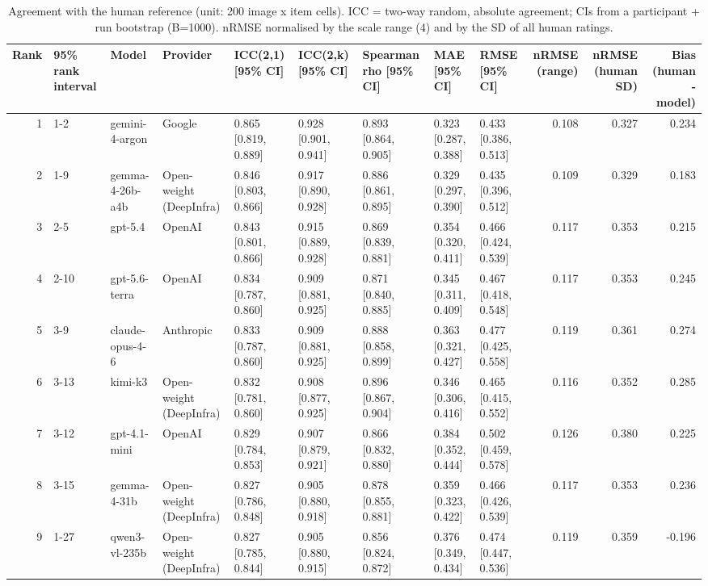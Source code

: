 \begin{table}
\caption{Agreement with the human reference (unit: 200 image x item cells). ICC = two-way random, absolute agreement; CIs from a participant + run bootstrap (B=1000). nRMSE normalised by the scale range (4) and by the SD of all human ratings.}
\begin{tabular}{rllllllllrrr}
\toprule
Rank & 95\% rank interval & Model & Provider & ICC(2,1) [95\% CI] & ICC(2,k) [95\% CI] & Spearman rho [95\% CI] & MAE [95\% CI] & RMSE [95\% CI] & nRMSE (range) & nRMSE (human SD) & Bias (human - model) \\
\midrule
1 & 1-2 & gemini-4-argon & Google & 0.865 [0.819, 0.889] & 0.928 [0.901, 0.941] & 0.893 [0.864, 0.905] & 0.323 [0.287, 0.388] & 0.433 [0.386, 0.513] & 0.108 & 0.327 & 0.234 \\
2 & 1-9 & gemma-4-26b-a4b & Open-weight (DeepInfra) & 0.846 [0.803, 0.866] & 0.917 [0.890, 0.928] & 0.886 [0.861, 0.895] & 0.329 [0.297, 0.390] & 0.435 [0.396, 0.512] & 0.109 & 0.329 & 0.183 \\
3 & 2-5 & gpt-5.4 & OpenAI & 0.843 [0.801, 0.866] & 0.915 [0.889, 0.928] & 0.869 [0.839, 0.881] & 0.354 [0.320, 0.411] & 0.466 [0.424, 0.539] & 0.117 & 0.353 & 0.215 \\
4 & 2-10 & gpt-5.6-terra & OpenAI & 0.834 [0.787, 0.860] & 0.909 [0.881, 0.925] & 0.871 [0.840, 0.885] & 0.345 [0.311, 0.409] & 0.467 [0.418, 0.548] & 0.117 & 0.353 & 0.245 \\
5 & 3-9 & claude-opus-4-6 & Anthropic & 0.833 [0.787, 0.860] & 0.909 [0.881, 0.925] & 0.888 [0.858, 0.899] & 0.363 [0.321, 0.427] & 0.477 [0.425, 0.558] & 0.119 & 0.361 & 0.274 \\
6 & 3-13 & kimi-k3 & Open-weight (DeepInfra) & 0.832 [0.781, 0.860] & 0.908 [0.877, 0.925] & 0.896 [0.867, 0.904] & 0.346 [0.306, 0.416] & 0.465 [0.415, 0.552] & 0.116 & 0.352 & 0.285 \\
7 & 3-12 & gpt-4.1-mini & OpenAI & 0.829 [0.784, 0.853] & 0.907 [0.879, 0.921] & 0.866 [0.832, 0.880] & 0.384 [0.352, 0.444] & 0.502 [0.459, 0.578] & 0.126 & 0.380 & 0.225 \\
8 & 3-15 & gemma-4-31b & Open-weight (DeepInfra) & 0.827 [0.786, 0.848] & 0.905 [0.880, 0.918] & 0.878 [0.855, 0.881] & 0.359 [0.323, 0.422] & 0.466 [0.426, 0.539] & 0.117 & 0.353 & 0.236 \\
9 & 1-27 & qwen3-vl-235b & Open-weight (DeepInfra) & 0.827 [0.785, 0.844] & 0.905 [0.880, 0.915] & 0.856 [0.824, 0.872] & 0.376 [0.349, 0.434] & 0.474 [0.447, 0.536] & 0.119 & 0.359 & -0.196 \\

\end{tabular}
\end{table}
